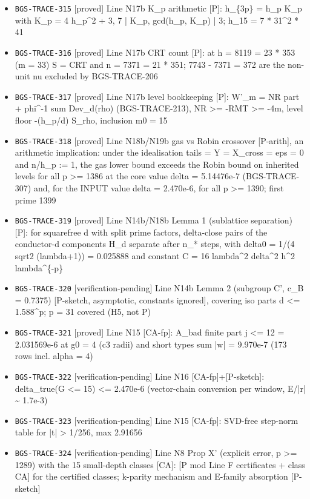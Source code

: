 \begin{itemize}
  \item \texttt{BGS-TRACE-315} [proved] Line N17b K\_p arithmetic [P]: h\_\{3p\} = h\_p K\_p with K\_p = 4 h\_p\textasciicircum{}2 + 3, 7 | K\_p, gcd(h\_p, K\_p) | 3; h\_15 = 7 * 31\textasciicircum{}2 * 41
  \item \texttt{BGS-TRACE-316} [proved] Line N17b CRT count [P]: at h = 8119 = 23 * 353 (m = 33) S = CRT and n = 7371 = 21 * 351; 7743 - 7371 = 372 are the non-unit nu excluded by BGS-TRACE-206
  \item \texttt{BGS-TRACE-317} [proved] Line N17b level bookkeeping [P]: W'\_m = NR part + phi\textasciicircum{}-1 sum Dev\_d(rho) (BGS-TRACE-213), NR >= -RMT >= -4m, level floor -(h\_p/d) S\_rho, inclusion m0 = 15
  \item \texttt{BGS-TRACE-318} [proved] Line N18b/N19b gas vs Robin crossover [P-arith], an arithmetic implication: under the idealisation tails = Y = X\_cross = eps = 0 and n/h\_p := 1, the gas lower bound exceeds the Robin bound on inherited levels for all p >= 1386 at the core value delta = 5.14476e-7 (BGS-TRACE-307) and, for the INPUT value delta = 2.470e-6, for all p >= 1390; first prime 1399
  \item \texttt{BGS-TRACE-319} [proved] Line N14b/N18b Lemma 1 (sublattice separation) [P]: for squarefree d with split prime factors, delta-close pairs of the conductor-d components H\_d separate after n\_* steps, with delta0 = 1/(4 sqrt2 (lambda+1)) = 0.025888 and constant C = 16 lambda\textasciicircum{}2 delta\textasciicircum{}2 h\textasciicircum{}2 lambda\textasciicircum{}\{-p\}
  \item \texttt{BGS-TRACE-320} [verification-pending] Line N14b Lemma 2 (subgroup C', c\_B = 0.7375) [P-sketch, asymptotic, constants ignored], covering iso parts d <= 1.588\textasciicircum{}p; p = 31 covered (H5, not P)
  \item \texttt{BGS-TRACE-321} [proved] Line N15 [CA-fp]: A\_bad finite part j <= 12 = 2.031569e-6 at g0 = 4 (c3 radii) and short types sum |w| = 9.970e-7 (173 rows incl. alpha = 4)
  \item \texttt{BGS-TRACE-322} [verification-pending] Line N16 [CA-fp]+[P-sketch]: delta\_true(G <= 15) <= 2.470e-6 (vector-chain conversion per window, E/|r| \textasciitilde{} 1.7e-3)
  \item \texttt{BGS-TRACE-323} [verification-pending] Line N15 [CA-fp]: SVD-free step-norm table for |t| > 1/256, max 2.91656
  \item \texttt{BGS-TRACE-324} [verification-pending] Line N8 Prop X' (explicit error, p >= 1289) with the 15 small-depth classes [CA]: [P mod Line F certificates + class CA] for the certified classes; k-parity mechanism and E-family absorption [P-sketch]
\end{itemize}
